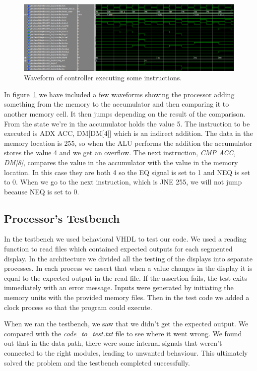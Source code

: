 \documentclass[a4,11pt]{article}
\begin{document}
\begin{figure}[h!]
	\centering
	\includegraphics[width=1\textwidth]{Figurer/controller.PNG}
	\caption{Waveform of controller executing some instructions.}
	\label{fig:con}
\end{figure}
\newpage
In figure~\ref{fig:con} we have included a few waveforms showing the processor adding something 
from the memory to the accumulator and then comparing it to another memory cell. It then jumps 
depending on the result of the comparison. From the state we're in the accumulator holds the value 5. 
The instruction to be executed is ADX ACC, DM[DM[4]] which is an indirect addition. The data in the 
memory location is 255, so when the ALU performs the addition the accumulator stores the value 4 and 
we get an overflow. The next instruction, \emph{CMP ACC, DM[8]}, compares the value in the accumulator 
with the value in the memory location. In this case they are both 4 so the EQ signal is set to 1 and 
NEQ is set to 0. When we go to the next instruction, which is JNE 255, we will not jump because NEQ is 
set to 0.

\subsection{Processor's Testbench}

In the testbench we used behavioral VHDL to test our code. We used a reading function to read files which
contained expected outputs for each segmented display. In the architecture we divided all the testing 
of the displays into separate processes. In each process we assert that when a value changes in the display
it is equal to the expected output in the read file. If the assertion fails, the test exits immediately 
with an error message. Inputs were generated by initiating the memory units with the provided memory files.
Then in the test code we added a clock process so that the program could execute.

When we ran the testbench, we saw that we didn't get the expected output. We compared with the
{\it code\_to\_test.txt} file to see where it went wrong. We found out that in the data path,
there were some internal signals that weren't connected to the right modules, leading to unwanted
behaviour. This ultimately solved the problem and the testbench completed successfully.
\end{document}
